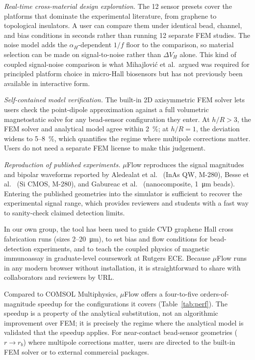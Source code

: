 \documentclass[preprint,12pt,a4paper]{elsarticle}
\begin{document}
\textit{Real-time cross-material design exploration.} The 12 sensor presets cover the platforms that dominate the experimental literature, from graphene to topological insulators. A user can compare them under identical bead, channel, and bias conditions in seconds rather than running 12 separate FEM studies. The noise model adds the $\alpha_H$-dependent $1/f$ floor to the comparison, so material selection can be made on signal-to-noise rather than $\Delta V_H$ alone. This kind of coupled signal-noise comparison is what Mihajlovi\'{c} et al.\ argued was required for principled platform choice in micro-Hall biosensors \cite{mihajlovic2007} but has not previously been available in interactive form.

\textit{Self-contained model verification.} The built-in 2D axisymmetric FEM solver lets users check the point-dipole approximation against a full volumetric magnetostatic solve for any bead-sensor configuration they enter. At $h/R > 3$, the FEM solver and analytical model agree within \SI{2}{\percent}; at $h/R = 1$, the deviation widens to \SI{5}{}--\SI{8}{\percent}, which quantifies the regime where multipole corrections matter. Users do not need a separate FEM license to make this judgement.

\textit{Reproduction of published experiments.} $\mu$Flow reproduces the signal magnitudes and bipolar waveforms reported by Aledealat et al.\ \cite{aledealat2009} (InAs QW, M-280), Besse et al.\ \cite{besse2002} (Si CMOS, M-280), and Gabureac et al.\ \cite{gabureac2013} (nanocomposite, \SI{1}{\micro\meter} beads). Entering the published geometries into the simulator is sufficient to recover the experimental signal range, which provides reviewers and students with a fast way to sanity-check claimed detection limits.

In our own group, the tool has been used to guide CVD graphene Hall cross fabrication runs (sizes \SI{2}{}--\SI{20}{\micro\meter}), to set bias and flow conditions for bead-detection experiments, and to teach the coupled physics of magnetic immunoassay in graduate-level coursework at Rutgers ECE. Because $\mu$Flow runs in any modern browser without installation, it is straightforward to share with collaborators and reviewers by URL.

Compared to COMSOL Multiphysics, $\mu$Flow offers a four-to-five orders-of-magnitude speedup for the configurations it covers (Table~\ref{tab:perf}). The speedup is a property of the analytical substitution, not an algorithmic improvement over FEM; it is precisely the regime where the analytical model is validated that the speedup applies. For near-contact bead-sensor geometries ($r \to r_b$) where multipole corrections matter, users are directed to the built-in FEM solver or to external commercial packages.
\end{document}
